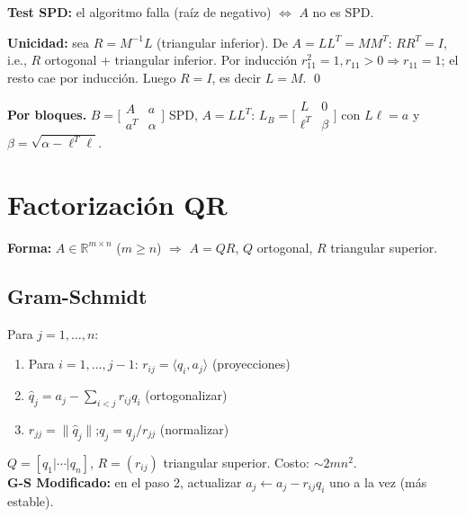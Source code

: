\documentclass[12pt,a4paper]{article}
\begin{document}
\textbf{Test SPD:} el algoritmo falla (raíz de negativo) $\Leftrightarrow$ $A$ no es SPD.

\begin{resultado}
\textbf{Unicidad:} sea $R=M^{-1}L$ (triangular inferior). De $A=LL^T=MM^T$: $RR^T=I$, i.e., $R$ ortogonal $+$ triangular inferior. Por inducción $r_{11}^2=1,r_{11}>0\Rightarrow r_{11}=1$; el resto cae por inducción. Luego $R=I$, es decir $L=M$. \qed
\end{resultado}

\textbf{Por bloques.} $B=\bigl[\begin{smallmatrix}A&a\\a^T&\alpha\end{smallmatrix}\bigr]$ SPD, $A=LL^T$:
$L_B=\bigl[\begin{smallmatrix}L&0\\\ell^T&\beta\end{smallmatrix}\bigr]$ con $L\ell=a$ y $\beta=\sqrt{\alpha-\ell^T\ell}$.

\section{Factorización QR}

\textbf{Forma:} $A\in\mathbb{R}^{m\times n}$ ($m\ge n$) $\Rightarrow$ $A=QR$, $Q$ ortogonal, $R$ triangular superior.

\subsection{Gram-Schmidt}

\begin{algoritmo}[title={QR por Gram-Schmidt (Clásico)}]
Para $j=1,\ldots,n$:
\begin{enumerate}[noitemsep]
  \item Para $i=1,\ldots,j-1$: $r_{ij}=\langle q_i,a_j\rangle$ \quad(proyecciones)
  \item $\hat q_j = a_j - \sum_{i<j}r_{ij}q_i$ \quad(ortogonalizar)
  \item $r_{jj}=\|\hat q_j\|$;\quad $q_j=\hat q_j/r_{jj}$ \quad(normalizar)
\end{enumerate}
$Q=[q_1|\cdots|q_n]$, $R=(r_{ij})$ triangular superior. Costo: $\sim2mn^2$.\\
\textbf{G-S Modificado:} en el paso 2, actualizar $a_j\leftarrow a_j-r_{ij}q_i$ uno a la vez (más estable).
\end{algoritmo}
\end{document}

